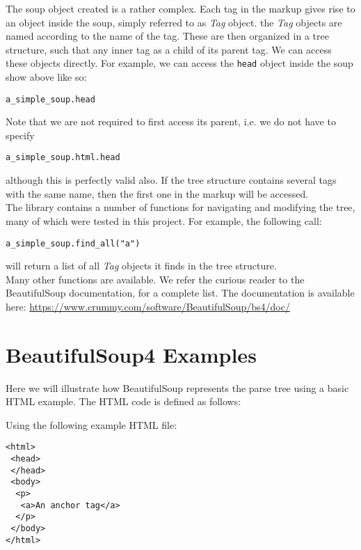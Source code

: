 \documentclass[10pt]{article}
\begin{document}
The soup object created is a rather complex. Each tag in the markup gives rise to an object inside the soup, simply referred to as \textit{Tag} object. the \textit{Tag} objects are named according to the name of the tag. These are then organized in a tree structure, such that any inner tag as a child of its parent tag. We can access these objects directly. For example, we can access the \texttt{head} object inside the soup show above like so:

\begin{lstlisting}[style = pythonstyle]
a_simple_soup.head
\end{lstlisting}

Note that we are not required to first access its parent, i.e. we do not have to specify
\begin{lstlisting}[style = pythonstyle]
a_simple_soup.html.head
\end{lstlisting}
although this is perfectly valid also. If the tree structure contains several tags with the same name, then the first one in the markup will be accessed.  \\

The library contains a number of functions for navigating and modifying the tree, many of which were tested in this project. For example, the following call: 

\begin{lstlisting}[style = pythonstyle]
a_simple_soup.find_all("a")
\end{lstlisting}
will return a list of all \textit{Tag} objects it finds in the tree structure. \\


Many other functions are available. We refer the curious reader to the BeautifulSoup documentation, for a complete list. The documentation is available here: \url{https://www.crummy.com/software/BeautifulSoup/bs4/doc/}

\iffalse
\section{BeautifulSoup4 Examples}
Here we will illustrate how BeautifulSoup represents the parse tree using a basic HTML example. The HTML code is defined as follows:

Using the following example HTML file:



\begin{lstlisting}[style = htmlstyle]
<html>
 <head>
 </head>
 <body>
  <p>
   <a>An anchor tag</a>
  </p>
 </body>
</html>
\end{lstlisting}
\end{document}
